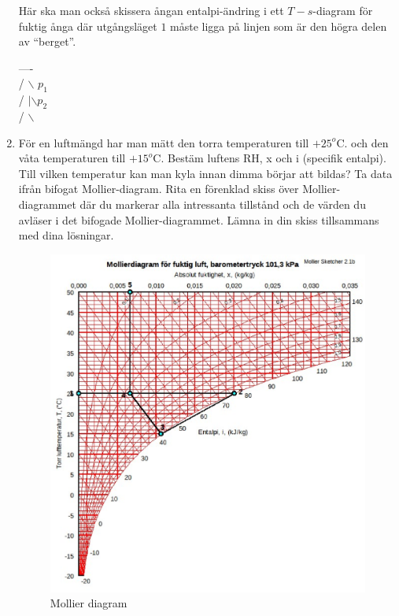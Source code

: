 \documentclass[./exercises.tex]{subfiles}
\begin{document}
\begin{enumerate}
Här ska man också skissera ångan entalpi-ändring i ett $T-s$-diagram för
fuktig ånga där utgångsläget $1$ måste ligga på linjen som är den högra delen av ``berget''.

\hspace{0.5em}   ----\\
\hspace{3em}    / \hspace{1em}     $\backslash$ $p_1$\\
\hspace{2em} / \hspace{1.5em}    $|\backslash p_2$\\
\hspace{1em}  /  \hspace{2em}        $\backslash$\\

\vfill\null
\clearpage
\columnbreak
\newpage

\item För en luftmängd har man mätt den torra temperaturen till $+25^o$C.
och den våta temperaturen till $+15^o$C.
Bestäm luftens RH, x och i (specifik entalpi).
Till vilken temperatur kan man kyla innan dimma börjar att bildas?
Ta data ifrån bifogat Mollier-diagram.
Rita en förenklad skiss över Mollier-diagrammet där du markerar
alla intressanta tillstånd och de värden du avläser i det bifogade Mollier-diagrammet.
Lämna in din skiss tillsammans med dina lösningar.

\begin{figure}[H]
  \includegraphics[width=\linewidth]{process2.eps}
  \caption{Mollier diagram}
  \label{fig4}
\end{figure}


\end{enumerate}
\end{document}
